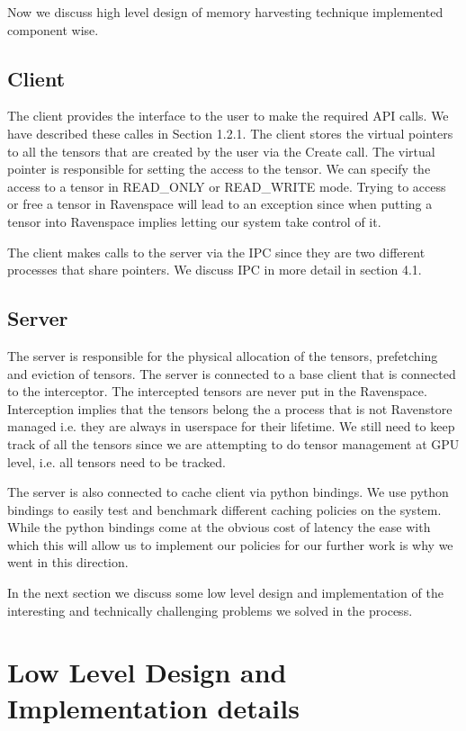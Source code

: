 \documentclass{article}
\begin{document}
Now we discuss high level design of memory harvesting technique implemented component wise.

\subsection{Client}
The client provides the interface to the user to make the required API calls. We have described these calles in Section 1.2.1.
The client stores the virtual pointers to all the tensors that are created by the user via the Create call. The virtual pointer is
responsible for setting the access to the tensor. We can specify the access to a tensor in READ\_ONLY or READ\_WRITE mode. 
Trying to access or free a tensor in Ravenspace will lead to an exception since when putting a tensor into Ravenspace implies letting our
system take control of it.

The client makes calls to the server via the IPC since they are two different processes that share pointers. We discuss IPC in more detail in section 4.1.

\subsection{Server}
The server is responsible for the physical allocation of the tensors, prefetching and eviction of tensors.
The server is connected to a base client that is connected to the interceptor. The intercepted tensors are
never put in the Ravenspace. Interception implies that the tensors belong the a process that is not Ravenstore managed i.e.
they are always in userspace for their lifetime.
We still need to keep track of all the tensors since we are attempting to do tensor management at GPU level, i.e. all tensors
need to be tracked.

The server is also connected to cache client via python bindings. We use python bindings to easily test and benchmark different
caching policies on the system. While the python bindings come at the obvious cost of latency the ease with which this will allow us 
to implement our policies for our further work is why we went in this direction.

In the next section we discuss some low level design and implementation
of the interesting and technically challenging problems we solved in the process.


\section{Low Level Design and Implementation details}
\end{document}
